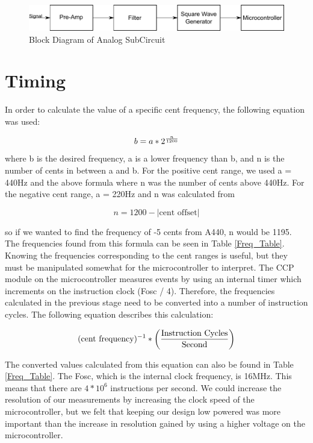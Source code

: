 \documentclass[12pt]{article}
\begin{document}
\begin{figure}[H]
\centering
	\includegraphics[width=6in]{"Analog Subcircuit"}
	\caption{Block Diagram of Analog SubCircuit}
	\label{analog_block} 
\end{figure}

\section{Timing}

In order to calculate the value of a specific cent frequency, the following equation was used:

\begin{equation}
b = a * 2^{n \over 1200}
\end{equation}
where b is the desired frequency, a is a lower frequency than b, and n is the number of cents in between
a and b. For the positive cent range, we used a = 440Hz and the above formula where n was the number
of cents above 440Hz. For the negative cent range, a = 220Hz and n was calculated from

\begin{equation}
n = 1200 - |\mbox{cent offset}|
\end{equation}

so if we wanted to find the frequency of -5 cents from A440, n would be 1195. The frequencies found
from this formula can be seen in Table \ref{Freq_Table}. Knowing the frequencies corresponding to the cent ranges
is useful, but they must be manipulated somewhat for the microcontroller to interpret. The CCP module
on the microcontroller measures events by using an internal timer which increments on the instruction
clock (Fosc / 4). Therefore, the frequencies calculated in the previous stage need to be converted into a
number of instruction cycles. The following equation describes this calculation:

\begin{equation}
(\mbox{cent frequency})^{-1} * \left({ \mbox{Instruction Cycles} \over \mbox{Second}}\right)
\end{equation}

The converted values calculated from this equation can also be found in Table \ref{Freq_Table}. The Fosc, which is the
internal clock frequency, is 16MHz. This means that there are $4 *10^6$ instructions per second. We could
increase the resolution of our measurements by increasing the clock speed of the microcontroller, but
we felt that keeping our design low powered was more important than the increase in resolution gained
by using a higher voltage on the microcontroller.
\end{document}
